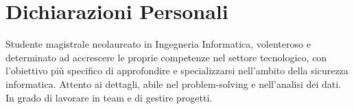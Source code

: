 \documentclass[a4paper,10pt]{article} %
\begin{document}
%
%
%
%
%



\section{Dichiarazioni Personali}

Studente magistrale neolaureato in Ingegneria Informatica, volenteroso e determinato ad accrescere le proprie competenze nel settore tecnologico, 
con l'obiettivo più specifico di approfondire e specializzarsi nell'ambito della sicurezza informatica.
Attento ai dettagli, abile nel problem-solving e nell'analisi dei dati. In grado di lavorare in team e di gestire progetti.
\end{document}
